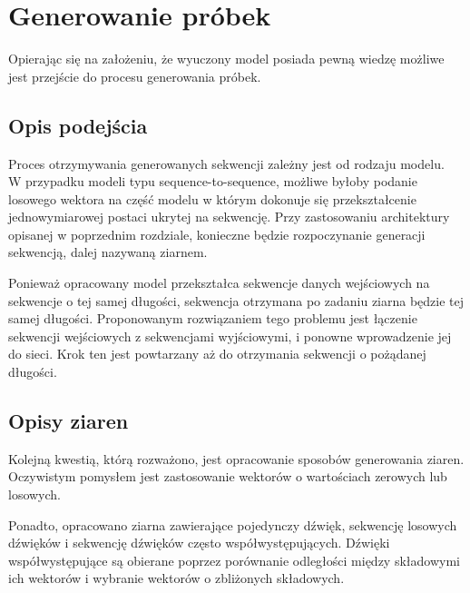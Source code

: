 \chapter{Generowanie próbek} 
{
    Opierając się na założeniu, że wyuczony model posiada pewną wiedzę możliwe jest przejście
    do procesu generowania próbek.

    \section{Opis podejścia}
    {
        Proces otrzymywania generowanych sekwencji zależny jest od rodzaju modelu.
        W\,\,przypadku modeli typu sequence-to-sequence, możliwe byłoby podanie losowego 
        wektora na część modelu w\,\,którym dokonuje się przekształcenie jednowymiarowej postaci ukrytej na sekwencję.
        Przy zastosowaniu architektury opisanej w\,\,poprzednim rozdziale, konieczne będzie 
        rozpoczynanie generacji sekwencją, dalej nazywaną ziarnem. 

        Ponieważ opracowany model przekształca sekwencje danych wejściowych na sekwencje
        o\,\,tej samej długości, sekwencja otrzymana po zadaniu ziarna będzie tej samej długości.
        Proponowanym rozwiązaniem tego problemu jest łączenie sekwencji wejściowych z\,\,sekwencjami wyjściowymi,
        i\,\,ponowne wprowadzenie jej do sieci. Krok ten jest powtarzany aż do otrzymania sekwencji o\,\,pożądanej długości.
    }

    \newpage

    \section{Opisy ziaren}
    {
        Kolejną kwestią, którą rozważono, jest opracowanie sposobów generowania ziaren.
        Oczywistym pomysłem jest zastosowanie wektorów o\,\,wartościach zerowych lub losowych.

        Ponadto, opracowano ziarna zawierające pojedynczy dźwięk, sekwencję losowych dźwięków
        i\,\,sekwencję dźwięków często współwystępujących. Dźwięki współwystępujące są obierane poprzez
        porównanie odległości między składowymi ich wektorów i\,\,wybranie wektorów o\,\,zbliżonych składowych.
    }
}